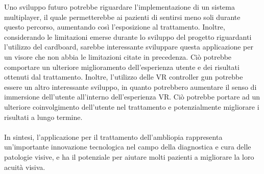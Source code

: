 \documentclass[
a4paper,
cleardoublepage=empty,
headings=twolinechapter,
numbers=autoenddot,
]{scrbook}
\begin{document}
   Uno sviluppo futuro potrebbe riguardare l'implementazione di un sistema multiplayer, il quale permetterebbe ai pazienti di sentirsi meno soli durante questo percorso, aumentando così l'esposizione al trattamento. Inoltre, considerando le limitazioni emerse durante lo sviluppo del progetto riguardanti l'utilizzo del cardboard, sarebbe interessante sviluppare questa applicazione per un visore che non abbia le limitazioni citate in precedenza. Ciò potrebbe comportare un ulteriore miglioramento dell'esperienza utente e dei risultati ottenuti dal trattamento. Inoltre, l'utilizzo delle VR controller gun potrebbe essere un altro interessante sviluppo, in quanto potrebbero aumentare il senso di immersione dell'utente all'interno dell'esperienza VR. Ciò potrebbe portare ad un ulteriore coinvolgimento dell'utente nel trattamento e potenzialmente migliorare i risultati a lungo termine.\\\\
  
   In sintesi, l'applicazione per il trattamento dell'ambliopia rappresenta un'importante innovazione tecnologica nel campo della diagnostica e cura delle patologie visive, e ha il potenziale per aiutare molti pazienti a migliorare la loro acuità visiva.
    
	
		
\end{document}

